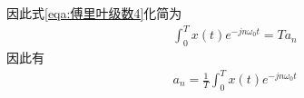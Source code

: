 因此式\ref{eqa:傅里叶级数4}化简为
\begin{equation}
    \begin{aligned}
        \int_{0}^{T}x(t)e^{-jn\omega_{0}t} = Ta_{n}
    \end{aligned}
    \label{eqa:傅里叶级数7}
\end{equation}
因此有
\begin{equation}
    \begin{aligned}
        a_{n} = \frac{1}{T}\int_{0}^{T}x(t)e^{-jn\omega_{0}t} 
    \end{aligned}
    \label{eqa:傅里叶级数8}
\end{equation}